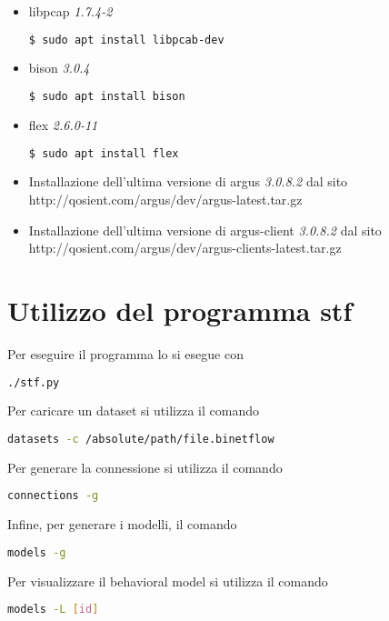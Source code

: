 \documentclass[../main.tex]{subfiles}
\begin{document}
\begin{itemize}
				\item libpcap \textit{1.7.4-2}
\begin{lstlisting}[language=bash]
$ sudo apt install libpcab-dev
\end{lstlisting}

\item bison \textit{3.0.4}
\begin{lstlisting}[language=bash]
$ sudo apt install bison
\end{lstlisting}

\item flex \textit{2.6.0-11}
\begin{lstlisting}[language=bash]
$ sudo apt install flex
\end{lstlisting}

\item Installazione dell'ultima versione di argus \textit{3.0.8.2} dal sito http://qosient.com/argus/dev/argus-latest.tar.gz

\item Installazione dell'ultima versione di argus-client \textit{3.0.8.2} dal sito http://qosient.com/argus/dev/argus-clients-latest.tar.gz

\end{itemize}

\section{Utilizzo del programma stf\\}
Per eseguire il programma lo si esegue con
\begin{lstlisting}[language=bash]
	./stf.py
\end{lstlisting}

Per caricare un dataset si utilizza il comando
\begin{lstlisting}[language=bash]
	datasets -c /absolute/path/file.binetflow	
\end{lstlisting}

Per generare la connessione si utilizza il comando
\begin{lstlisting}[language=bash]
	connections -g	
\end{lstlisting}

Infine, per generare i modelli, il comando
\begin{lstlisting}[language=bash]
	models -g	
\end{lstlisting}

Per visualizzare il behavioral model si utilizza il comando
\begin{lstlisting}[language=bash]
	models -L [id]	
\end{lstlisting}
\end{document}
